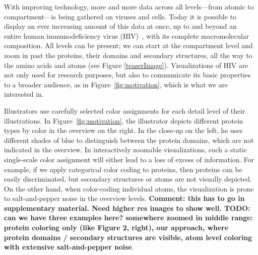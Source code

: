 \documentclass{egpubl}
\begin{document}
	With improving technology, more and more data across all levels---from atomic to compartment---is being gathered on viruses and cells. 
	Today it is possible to display an ever increasing amount of this data at once, up to and beyond an entire human immunodeficiency virus (HIV)~\cite{muzic2015cellview}, with its complete macromolecular composition.
	All levels can be present; we can start at the compartment level and zoom in past the proteins, their domains and secondary structures, all the way to the amino acids and atoms (see Figure \ref{teaserImage}). Visualizations of HIV are not only used for research purposes, but also to communicate its basic properties to a broader audience, as in Figure~\ref{fig:motivation}, which is what we are interested in.

	
	Illustrators use carefully selected color assignments for each detail level of their illustrations. 
	In Figure~\ref{fig:motivation}, the illustrator depicts different protein types by color in the overview on the right. 
	In the close-up on the left, he uses different shades of blue to distinguish between the protein domains, which are not indicated in the overview. 
	In interactively zoomable visualizations, such a static single-scale color assignment will either lead to a loss of excess of information. 
	For example, if we apply categorical color coding to proteins, then proteins can be easily discriminated, but secondary structures or atoms are not visually depicted.
	On the other hand, when color-coding individual atoms, the visualization is prone to salt-and-pepper noise in the overview levels. 
	\textbf{Comment: this has to go in supplementary material. Need higher res images to show well. TODO: can we have three examples here? somewhere zoomed in middle range: protein coloring only (like Figure 2, right), our approach, where protein domains / secondary structures are visible, atom level coloring with extensive salt-and-pepper noise}. 
		
\end{document}
